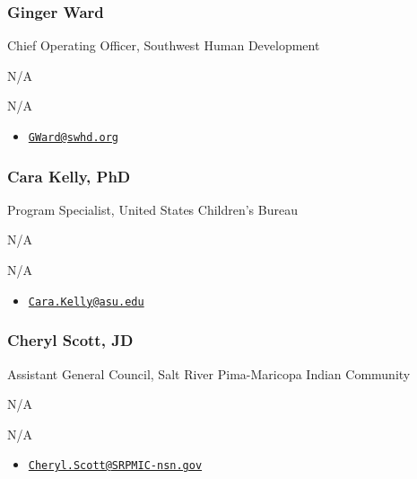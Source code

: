 \documentclass[
]{article}
\providecommand{\tightlist}{%
  \setlength{\itemsep}{0pt}\setlength{\parskip}{0pt}}
\begin{document}
\hypertarget{ginger-ward}{%
\subsubsection{Ginger Ward}\label{ginger-ward}}

Chief Operating Officer, Southwest Human Development

N/A

N/A

\begin{itemize}
\tightlist
\item
  \href{mailto:GWard@swhd.org}{\nolinkurl{GWard@swhd.org}}
\end{itemize}

\hypertarget{cara-kelly-phd}{%
\subsubsection{Cara Kelly, PhD}\label{cara-kelly-phd}}

Program Specialist, United States Children's Bureau

N/A

N/A

\begin{itemize}
\tightlist
\item
  \href{mailto:Cara.Kelly@asu.edu}{\nolinkurl{Cara.Kelly@asu.edu}}
\end{itemize}

\hypertarget{cheryl-scott-jd}{%
\subsubsection{Cheryl Scott, JD}\label{cheryl-scott-jd}}

Assistant General Council, Salt River Pima-Maricopa Indian Community

N/A

N/A

\begin{itemize}
\tightlist
\item
  \href{mailto:Cheryl.Scott@SRPMIC-nsn.gov}{\nolinkurl{Cheryl.Scott@SRPMIC-nsn.gov}}
\end{itemize}
\end{document}
